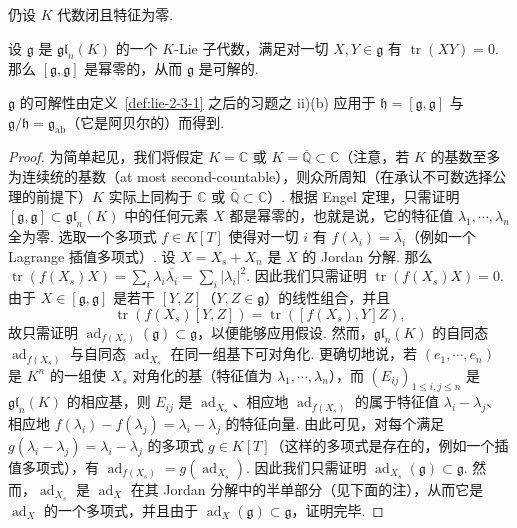 \begin{numpara}\label{np:lie-2-3-4}
仍设 $K$ 代数闭且特征为零.
\begin{proposition*}
设 $\mathfrak g$ 是 $\mathfrak{gl}_{n}(K)$ 的一个 $K$-Lie 子代数，满足对一切 $X,Y\in\mathfrak g$ 有 $\operatorname{tr}(XY)=0$. 那么 $[\mathfrak g,\mathfrak g]$ 是幂零的，从而 $\mathfrak g$ 是可解的.
\end{proposition*}
\begin{remark*}
$\mathfrak g$ 的可解性由定义~\ref{def:lie-2-3-1} 之后的习题之 ii)(b) 应用于 $\mathfrak h=[\mathfrak g,\mathfrak g]$ 与 $\mathfrak g/\mathfrak h=\mathfrak g_{\mathrm{ab}}$（它是阿贝尔的）而得到.
\end{remark*}
\begin{proof}
为简单起见，我们将假定 $K=\mathbb C$ 或 $K=\overline{\mathbb Q}\subset\mathbb C$（注意，若 $K$ 的基数至多为连续统的基数（at most second-countable），则众所周知（在承认不可数选择公理的前提下）$K$ 实际上同构于 $\mathbb C$ 或 $\overline{\mathbb Q}\subset\mathbb C$）. 根据 Engel 定理，只需证明 $[\mathfrak g,\mathfrak g]\subset\mathfrak{gl}_{n}(K)$ 中的任何元素 $X$ 都是幂零的，也就是说，它的特征值 $\lambda_{1},\cdots,\lambda_{n}$ 全为零. 选取一个多项式 $f\in K[T]$ 使得对一切 $i$ 有 $f(\lambda_{i})=\overline{\lambda_{i}}$（例如一个 Lagrange 插值多项式）. 设 $X=X_{s}+X_{n}$ 是 $X$ 的 Jordan 分解. 那么 $\operatorname{tr}(f(X_{s})X)=\sum_{i}\lambda_{i}\overline{\lambda_{i}}=\sum_{i}|\lambda_{i}|^{2}$. 因此我们只需证明 $\operatorname{tr}(f(X_{s})X)=0$. 由于 $X\in[\mathfrak g,\mathfrak g]$ 是若干 $[Y,Z]$（$Y,Z\in\mathfrak g$）的线性组合，并且
\[
\operatorname{tr}(f(X_{s})[Y,Z])=\operatorname{tr}([f(X_{s}),Y]Z),
\]
故只需证明 $\operatorname{ad}_{f(X_{s})}(\mathfrak g)\subset\mathfrak g$，以便能够应用假设. 然而，$\mathfrak{gl}_{n}(K)$ 的自同态 $\operatorname{ad}_{f(X_{s})}$ 与自同态 $\operatorname{ad}_{X_{s}}$ 在同一组基下可对角化. 更确切地说，若 $(e_{1},\cdots,e_{n})$ 是 $K^{n}$ 的一组使 $X_{s}$ 对角化的基（特征值为 $\lambda_{1},\cdots,\lambda_{n}$），而 $(E_{ij})_{1\leqslant i,j\leqslant n}$ 是 $\mathfrak{gl}_{n}(K)$ 的相应基，则 $E_{ij}$ 是 $\operatorname{ad}_{X_{s}}$、相应地 $\operatorname{ad}_{f(X_{s})}$ 的属于特征值 $\lambda_{i}-\lambda_{j}$、相应地 $f(\lambda_{i})-f(\lambda_{j})=\lambda_{i}-\lambda_{j}$ 的特征向量. 由此可见，对每个满足 $g(\lambda_{i}-\lambda_{j})=\lambda_{i}-\lambda_{j}$ 的多项式 $g\in K[T]$（这样的多项式是存在的，例如一个插值多项式），有 $\operatorname{ad}_{f(X_{s})}=g(\operatorname{ad}_{X_{s}})$. 因此我们只需证明 $\operatorname{ad}_{X_{s}}(\mathfrak g)\subset\mathfrak g$. 然而，$\operatorname{ad}_{X_{s}}$ 是 $\operatorname{ad}_{X}$ 在其 Jordan 分解中的半单部分（见下面的注），从而它是 $\operatorname{ad}_{X}$ 的一个多项式，并且由于 $\operatorname{ad}_{X}(\mathfrak g)\subset\mathfrak g$，证明完毕.

\end{proof}
\end{numpara}
